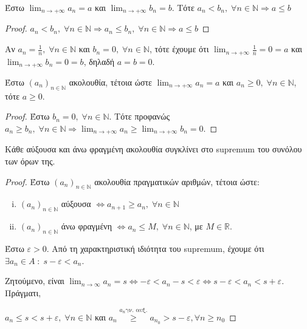 \documentclass[main.tex]{subfiles}
\begin{document}
\begin{prop}
    Έστω $ \lim_{n \to +\infty} a_{n} = a $ και $ \lim_{n \to +\infty} 
    b_{n} = b $. Τότε
    $
    a_{n} < b_{n}, \; \forall n \in \mathbb{N} \Rightarrow a \leq b
    $ 
\end{prop}

\begin{proof}
    $ a_{n}< b_{n}, \; \forall n \in \mathbb{N} \Rightarrow a_{n} \leq 
    b_{n}, \; \forall n \in \mathbb{N} \Rightarrow a \leq b $
\end{proof}

\begin{rem}
\item {}
    Αν $ a_{n}= \frac{1}{n}, \; \forall n \in \mathbb{N} $ 
    και $ b_{n}=0, \; \forall n \in \mathbb{N} $, τότε έχουμε ότι 
    $ \lim_{n \to +\infty} \frac{1}{n} = 0 = a $ και $ \lim_{n \to
    +\infty} b_{n} = 0 = b $, δηλαδή $ a=b=0  $.
\end{rem}

\begin{cor}
    Έστω $ (a_{n})_{n \in \mathbb{N}} $ ακολουθία, τέτοια ώστε 
    $ \lim_{n \to +\infty} a_{n} = a$ και $ a_{n} \geq 0, \; \forall 
    n \in \mathbb{N} $, τότε $ a \geq 0 $.
\end{cor}

\begin{proof}
    Έστω $ b_{n} = 0, \; \forall n \in \mathbb{N} $. Τότε προφανώς 
    $ a_{n} \geq b_{n}, \; \forall n
    \in \mathbb{N} \Rightarrow \lim_{n \to +\infty} a_{n} \geq 
    \lim_{n \to +\infty} b_{n} = 0$.
\end{proof}

\begin{thm}
    Κάθε αύξουσα και άνω φραγμένη ακολουθία συγκλίνει στο 
    supremum του συνόλου των όρων της.
\end{thm}

\begin{proof}
    Έστω $ (a_{n})_{n \in \mathbb{N}} $ ακολουθία πραγματικών αριθμών, 
    τέτοια ώστε:
    \begin{enumerate}[i)]
        \item $ (a_{n})_{n \in \mathbb{N}} $ αύξουσα $ \Leftrightarrow 
            a_{n+1} \geq a_{n}, \; \forall n \in \mathbb{N}$ 
        \item $ (a_{n})_{n \in \mathbb{N}} $ άνω  φραγμένη $ 
            \Leftrightarrow a_{n} \leq M, \; \forall n \in 
            \mathbb{N}$, με $ M \in \mathbb{R} $.
    \end{enumerate}

    Έστω $ \varepsilon >0 $. Από τη χαρακτηριστική ιδιότητα του 
    supremum, έχουμε ότι $ \exists a_{n} \in A \; : \; s - \varepsilon 
    < a_{n} $.

    Ζητούμενο, είναι $ \lim_{n \to \infty} a_{n} = s \Leftrightarrow 
    - \varepsilon < a_{n} -s < \varepsilon \Leftrightarrow s - 
    \varepsilon < a_{n} < s + \varepsilon $. Πράγματι, 

    $ a_{n} \leq s < s + \varepsilon, \; \forall n \in \mathbb{N} $ και 
    $ a_{n} \overset{a_{n} \text{γν. αυξ.}}{\geq} a_{n_{0}} > s - 
    \varepsilon, \forall n \geq n_{0} $
\end{proof}
\end{document}
